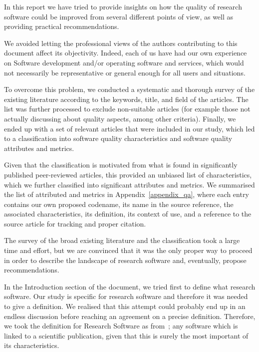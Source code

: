 In this report we have tried to provide insights on how the quality of research software could be improved from several different points of view, as well as providing practical recommendations.

We avoided letting the professional views of the authors contributing to this document affect its objectivity. Indeed, each of us have had our own experience on Software development and/or operating software and services, which would not necessarily be representative or general enough for all users and situations.

To overcome this problem, we conducted a systematic and thorough survey of the existing literature according to the keywords, title, and field of the articles. The list was further processed to exclude non-suitable articles (for example  those not actually discussing about quality aspects, among other criteria). Finally, we ended up with a set of relevant articles that were included in our study, which led to a classification into software quality characteristics and software quality attributes and metrics. 

Given that the classification is motivated from what is found in significantly published peer-reviewed articles, this provided an unbiased list of characteristics, which we further classified into significant attributes and metrics. We summarised the list of attributed and metrics in Appendix~\ref{appendix_qa}, where each entry contains our own proposed codename, its name in the source reference, the associated characteristics, its definition, its context of use, and a reference to the source article for tracking and proper citation.

The survey of the broad existing literature and the classification took a large time and effort, but we are convinced that it was the only proper way to proceed in order to describe the landscape of research software and, eventually, propose recommendations.

In the Introduction section of the document, we tried first to define what research software. Our study is specific for research software and therefore it was needed to give a definition. We realised that this attempt could probably end up in an endless discussion before reaching an agreement on a precise definition. Therefore, we took the definition for Research Software as from~\cite{gruenpeter_defining_2021}; any software which is linked to a scientific publication, given that this is surely the most important of its characteristics. 

